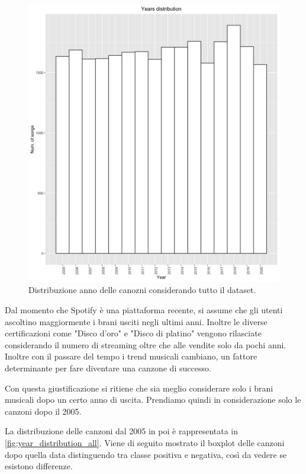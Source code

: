 \begin{figure}[H]
	\centering
	\includegraphics[width=13cm]{../images/years_distribution.png}
	\caption{Distribuzione anno delle canozni considerando tutto il dataset.}
	\label{fig:year_distribution_all}
\end{figure}

Dal momento che Spotify è una piattaforma recente, si assume che gli utenti ascoltino maggiormente i brani usciti negli ultimi anni. Inoltre le diverse certificazioni come "Disco d'oro" e "Disco di platino" vengono rilasciate considerando il numero di streaming oltre che alle vendite solo da pochi anni. Inoltre con il passare del tempo i trend musicali cambiano, un fattore determinante per fare diventare una canzone di successo.

Con questa giustificazione si ritiene che sia meglio considerare solo i brani musicali dopo un certo anno di uscita. Prendiamo quindi in considerazione solo le canzoni dopo il 2005.

La distribuzione delle canzoni dal 2005 in poi è rappresentata in \autoref{fig:year_distribution_all}. Viene di seguito mostrato il boxplot delle canzoni dopo quella data distinguendo tra classe positiva e negativa, così da vedere se esistono differenze.

